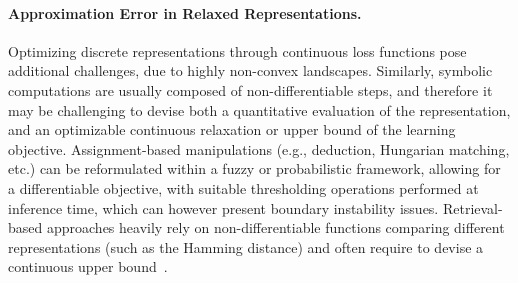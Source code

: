 \paragraph{Approximation Error in Relaxed Representations.}
Optimizing discrete representations through continuous loss functions pose additional challenges, due to highly non-convex landscapes. 
%
Similarly, symbolic computations are usually composed of non-differentiable steps, and therefore it may be challenging to devise both a quantitative evaluation of the representation, and an optimizable continuous relaxation or upper bound of the learning objective.
%
%
Assignment-based manipulations (e.g., deduction, Hungarian matching, etc.) can be reformulated within a fuzzy or probabilistic framework, allowing for a differentiable objective, with suitable thresholding operations performed at inference time, which can however present boundary instability issues.
%
Retrieval-based approaches heavily rely on non-differentiable functions comparing different representations (such as the Hamming distance) and often require to devise a continuous upper bound~\cite{norouzi2012hamming}.


